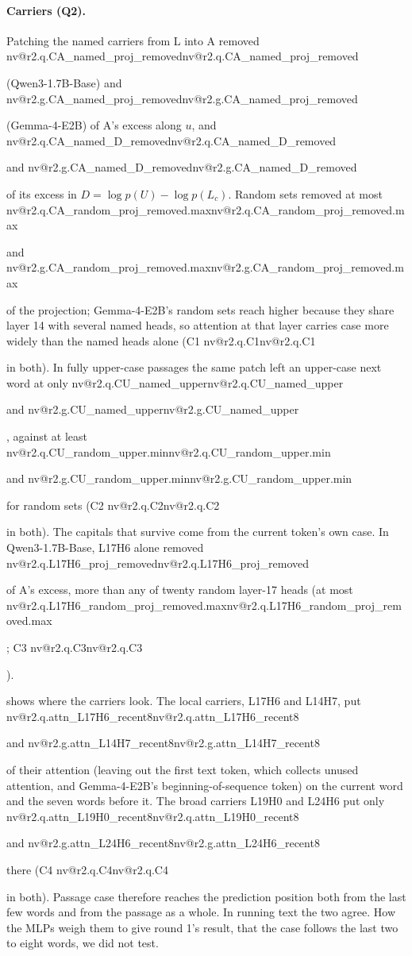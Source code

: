 \documentclass[11pt]{article}
\makeatletter
\newcommand{\nv}[1]{\ifcsname nv@#1\endcsname\csname nv@#1\endcsname\else\PackageError{numbers}{Unknown number key #1}{}\fi}
\newcommand{\gm}{Gemma-4-E2B}
\newcommand{\qw}{Qwen3-1.7B-Base}
\newcommand{\hd}[2]{L#1H#2}
\newcommand{\RQ}[1]{\nv{r2.q.#1}}
\newcommand{\RG}[1]{\nv{r2.g.#1}}
\makeatother
\begin{document}
\paragraph{Carriers (Q2).} Patching the named carriers from L into A removed \RQ{CA_named_proj_removed} (\qw{}) and \RG{CA_named_proj_removed} (\gm{}) of A's excess along $u$, and \RQ{CA_named_D_removed} and \RG{CA_named_D_removed} of its excess in $D=\log p(U)-\log p(L_c)$. Random sets removed at most \RQ{CA_random_proj_removed.max} and \RG{CA_random_proj_removed.max} of the projection; \gm{}'s random sets reach higher because they share layer 14 with several named heads, so attention at that layer carries case more widely than the named heads alone (C1 \RQ{C1} in both). In fully upper-case passages the same patch left an upper-case next word at only \RQ{CU_named_upper} and \RG{CU_named_upper}, against at least \RQ{CU_random_upper.min} and \RG{CU_random_upper.min} for random sets (C2 \RQ{C2} in both). The capitals that survive come from the current token's own case. In \qw{}, \hd{17}{6} alone removed \RQ{L17H6_proj_removed} of A's excess, more than any of twenty random layer-17 heads (at most \RQ{L17H6_random_proj_removed.max}; C3 \RQ{C3}).

 shows where the carriers look. The local carriers, \hd{17}{6} and \hd{14}{7}, put \RQ{attn_L17H6_recent8} and \RG{attn_L14H7_recent8} of their attention (leaving out the first text token, which collects unused attention, and \gm{}'s beginning-of-sequence token) on the current word and the seven words before it. The broad carriers \hd{19}{0} and \hd{24}{6} put only \RQ{attn_L19H0_recent8} and \RG{attn_L24H6_recent8} there (C4 \RQ{C4} in both). Passage case therefore reaches the prediction position both from the last few words and from the passage as a whole. In running text the two agree. How the MLPs weigh them to give round 1's result, that the case follows the last two to eight words, we did not test.
\end{document}
